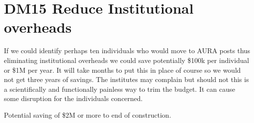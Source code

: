 \section{DM15 Reduce Institutional overheads}\label{sect:dm15}

If we could identify perhaps ten  individuals who would move to AURA posts thus eliminating institutional overheads we could save potentially  \$100k per individual or \$1M per year. It will take months to put this in place of course so we would not get three years of savings.
The institutes  may complain but should not
this is a scientifically and  functionally painless way to trim the budget. It can cause some disruption for the individuals concerned.

 Potential saving of \$2M  or more to end of construction.



